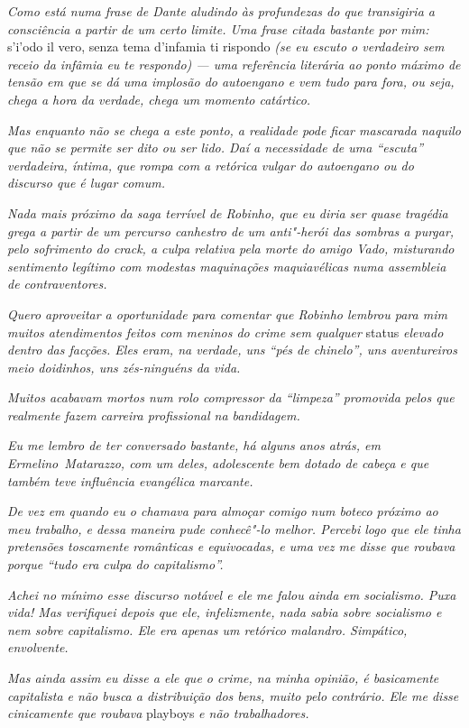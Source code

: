 \emph{Como está numa frase de Dante aludindo às profundezas do que
transigiria a consciência a partir de um certo limite. Uma frase citada
bastante por mim:} s'i'odo il vero, senza tema d'infamia ti rispondo \emph{(se
eu escuto o verdadeiro sem receio da infâmia eu te respondo) --- uma
referência literária ao ponto máximo de tensão em que se dá uma implosão
do autoengano e vem tudo para fora, ou seja, chega a hora da verdade,
chega um momento catártico.}

\emph{Mas enquanto não se chega a este ponto, a realidade pode ficar
mascarada naquilo que não se permite ser dito ou ser lido. Daí a
necessidade de uma ``escuta'' verdadeira, íntima, que rompa com a
retórica vulgar do autoengano ou do discurso que é lugar comum.}

\emph{Nada mais próximo da saga terrível de Robinho, que eu diria ser
quase tragédia grega a partir de um percurso canhestro de um anti"-herói
das sombras a purgar, pelo sofrimento do crack, a culpa relativa pela
morte do amigo Vado, misturando sentimento legítimo com modestas
maquinações maquiavélicas numa assembleia de contraventores.}

\emph{Quero aproveitar a oportunidade para comentar que Robinho lembrou
para mim muitos atendimentos feitos com meninos do crime sem qualquer}
status \emph{elevado dentro das facções. Eles eram, na verdade, uns ``pés de
chinelo'', uns aventureiros meio doidinhos, uns zés-ninguéns da vida.}

\emph{Muitos acabavam mortos num rolo compressor da ``limpeza''
promovida pelos que realmente fazem carreira profissional na
bandidagem.}

\emph{Eu me lembro de ter conversado bastante, há alguns anos atrás, em
Ermelino~Matarazzo, com um deles, adolescente bem dotado de cabeça e que
também teve influência evangélica marcante.}

\emph{De vez em quando eu o chamava para almoçar comigo num boteco
próximo ao meu trabalho, e dessa maneira pude conhecê"-lo melhor. Percebi
logo que ele tinha pretensões toscamente românticas e equivocadas, e uma
vez me disse que roubava porque ``tudo era culpa do capitalismo''.}

\emph{Achei no mínimo esse discurso notável e ele me falou ainda em
socialismo. Puxa vida! Mas verifiquei depois que ele, infelizmente, nada
sabia sobre socialismo e nem sobre capitalismo. Ele era apenas um
retórico malandro. Simpático, envolvente.}

\emph{Mas ainda assim eu disse a ele que o crime, na minha opinião, é
basicamente capitalista e não busca a distribuição dos bens, muito pelo
contrário. Ele me disse cinicamente que roubava} playboys \emph{e não
trabalhadores.}

